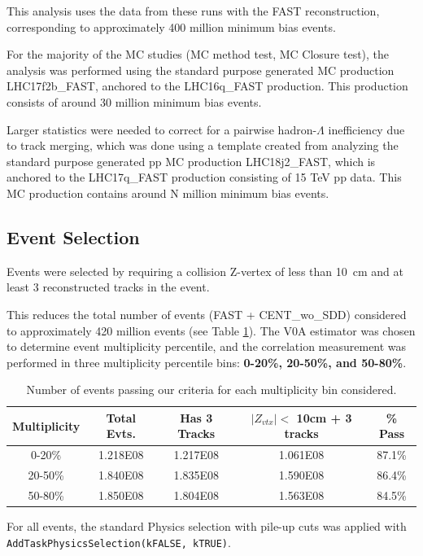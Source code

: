 \documentclass[ALICE,manyauthors]{ALICE_analysis_notes}
\begin{document}
This analysis uses the data from these runs with the FAST reconstruction, corresponding to approximately 400 million minimum bias events.

For the majority of the MC studies (MC method test, MC Closure test), the analysis was performed using the standard purpose generated MC production LHC17f2b\_FAST, anchored to the LHC16q\_FAST production. This production consists of around 30 million minimum bias events.

Larger statistics were needed to correct for a pairwise hadron-$\Lambda$ inefficiency due to track merging, which was done using a template created from analyzing the standard purpose generated pp MC production LHC18j2\_FAST, which is anchored to the LHC17q\_FAST production consisting of 15 TeV pp data. 
This MC production contains around N million minimum bias events.

\subsection{Event Selection}

Events were selected by requiring a collision Z-vertex of less than \SI{10}{cm} and at least 3 reconstructed tracks in the event.  

This reduces the total number of events (FAST + CENT\_wo\_SDD) considered to approximately 420 million events (see Table \ref{event_table}). The V0A estimator was chosen to determine event multiplicity percentile, and the correlation measurement was performed in three multiplicity percentile bins: \textbf{0-20\%, 20-50\%, and 50-80\%}.

\begin{table}[h!]
    \centering
\begin{tabular}{| c | c | c | c || c | }
\hline
Multiplicity & Total Evts. & Has 3 Tracks & $|Z_{vtx}| <$  10cm + 3 tracks & \% Pass \\
\hline
0-20\% & 1.218E08 & 1.217E08 & 1.061E08 & 87.1\%\\
20-50\% & 1.840E08 & 1.835E08 & 1.590E08 & 86.4\%\\
50-80\% & 1.850E08 & 1.804E08 & 1.563E08 & 84.5\%\\
\hline
\end{tabular}
\caption{Number of events passing our criteria for each multiplicity bin considered.}
\label{event_table}
\end{table}

For all events, the standard Physics selection with pile-up cuts was applied with \texttt{AddTaskPhysicsSelection(kFALSE, kTRUE)}.
\end{document}
